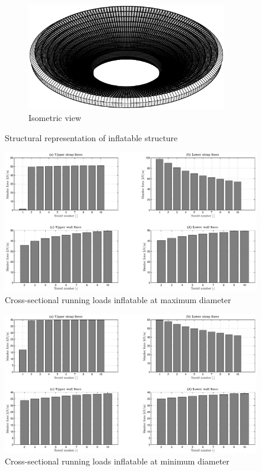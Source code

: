 \begin{figure}[h]
\begin{subfigure}[c]{0.5\textwidth}
		\includegraphics[width=0.96\textwidth]{./Figure/Structure/struc_rep.eps}
		\caption{Isometric view}
		\label{fig:iso}
	\end{subfigure}
\caption{Structural representation of inflatable structure}
\label{fig:strucreps}
\end{figure}

\begin{figure}[h]
		\hspace{-16mm}
		\includegraphics[width=1.2\textwidth]{./Figure/Structure/loads_long.eps}
		\caption{Cross-sectional running loads inflatable at maximum diameter}
		\label{fig:strucl}
\end{figure}
\begin{figure}[ht]
		\hspace{-16mm}
		\includegraphics[width=1.2\textwidth]{./Figure/Structure/loads_short.eps}
		\caption{Cross-sectional running loads inflatable at minimum diameter}
		\label{fig:strucs}
\end{figure}

